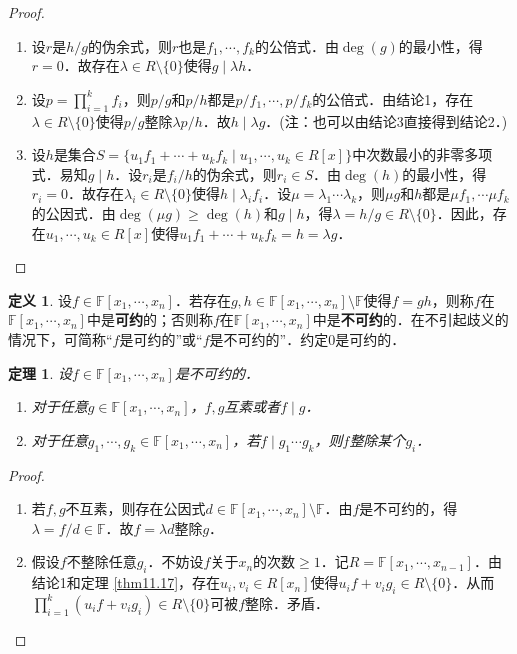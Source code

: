 \documentclass[a4paper,fontset=windows]{ctexbook}
\newtheorem{theorem}{定理}[chapter]
\theoremstyle{definition}
\newtheorem{definition}{定义}[chapter]
\renewcommand{\ge}{\geqslant}
\begin{document}
\begin{proof}~
\begin{enumerate}
\item 设$r$是$h/g$的伪余式，则$r$也是$f_1,\cdots,f_k$的公倍式．由$\deg(g)$的最小性，得$r=0$．故存在$\lambda\in R\setminus\{0\}$使得$g\mid\lambda h$．

\item 设$p=\prod\limits_{i=1}^kf_i$，则$p/g$和$p/h$都是$p/f_1,\cdots,p/f_k$的公倍式．由结论1，存在$\lambda\in R\setminus\{0\}$使得$p/g$整除$\lambda p/h$．故$h\mid\lambda g$．(注：也可以由结论3直接得到结论2．)

\item 设$h$是集合$S=\{u_1f_1+\cdots+u_kf_k\mid u_1,\cdots,u_k\in R[x]\}$中次数最小的非零多项式．易知$g\mid h$．设$r_i$是$f_i/h$的伪余式，则$r_i\in S$．由$\deg(h)$的最小性，得$r_i=0$．故存在$\lambda_i\in R\setminus\{0\}$使得$h\mid\lambda_if_i$．设$\mu=\lambda_1\cdots\lambda_k$，则$\mu g$和$h$都是$\mu f_1,\cdots\mu f_k$的公因式．由$\deg(\mu g)\ge\deg(h)$和$g\mid h$，得$\lambda=h/g\in R\setminus\{0\}$．因此，存在$u_1,\cdots,u_k\in R[x]$使得$u_1f_1+\cdots+u_kf_k=h=\lambda g$．\qedhere
\end{enumerate}
\end{proof}

\begin{definition}
设$f\in\mathbb{F}[x_1,\cdots,x_n]$．若存在$g,h\in\mathbb{F}[x_1,\cdots,x_n]\setminus\mathbb{F}$使得$f=gh$，则称$f$在$\mathbb{F}[x_1,\cdots,x_n]$中是{\bf 可约}的；否则称$f$在$\mathbb{F}[x_1,\cdots,x_n]$中是{\bf 不可约}的．在不引起歧义的情况下，可简称“$f$是可约的”或“$f$是不可约的”．约定0是可约的．
\end{definition}

\begin{theorem}\label{thm11.18}
设$f\in\mathbb{F}[x_1,\cdots,x_n]$是不可约的．
\begin{enumerate}
\item 对于任意$g\in\mathbb{F}[x_1,\cdots,x_n]$，$f,g$互素或者$f\mid g$．

\item 对于任意$g_1,\cdots,g_k\in\mathbb{F}[x_1,\cdots,x_n]$，若$f\mid g_1\cdots g_k$，则$f$整除某个$g_i$．
\end{enumerate}
\end{theorem}

\begin{proof}~
\begin{enumerate}
\item 若$f,g$不互素，则存在公因式$d\in\mathbb{F}[x_1,\cdots,x_n]\setminus\mathbb{F}$．由$f$是不可约的，得$\lambda=f/d\in\mathbb{F}$．故$f=\lambda d$整除$g$．

\item 假设$f$不整除任意$g_i$．不妨设$f$关于$x_n$的次数$\ge 1$．记$R=\mathbb{F}[x_1,\cdots,x_{n-1}]$．由结论1和定理 \ref{thm11.17}，存在$u_i,v_i\in R[x_n]$使得$u_if+v_ig_i\in R\setminus\{0\}$．从而$\prod\limits_{i=1}^k(u_if+v_ig_i)\in R\setminus\{0\}$可被$f$整除．矛盾．\qedhere
\end{enumerate}
\end{proof}
\end{document}
